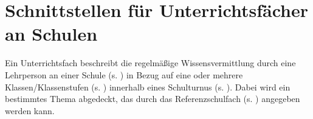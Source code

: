 \section{Schnittstellen für Unterrichtsfächer an Schulen}
Ein Unterrichtsfach beschreibt die regelmäßige Wissensvermittlung durch eine Lehrperson an einer Schule (s. ) in Bezug auf eine oder mehrere Klassen/Klassenstufen (s. ) innerhalb eines Schulturnus (s. ). Dabei wird ein bestimmtes Thema abgedeckt, das durch das Referenzschulfach (s. ) angegeben werden kann.


%


%
% 
% 

% 


